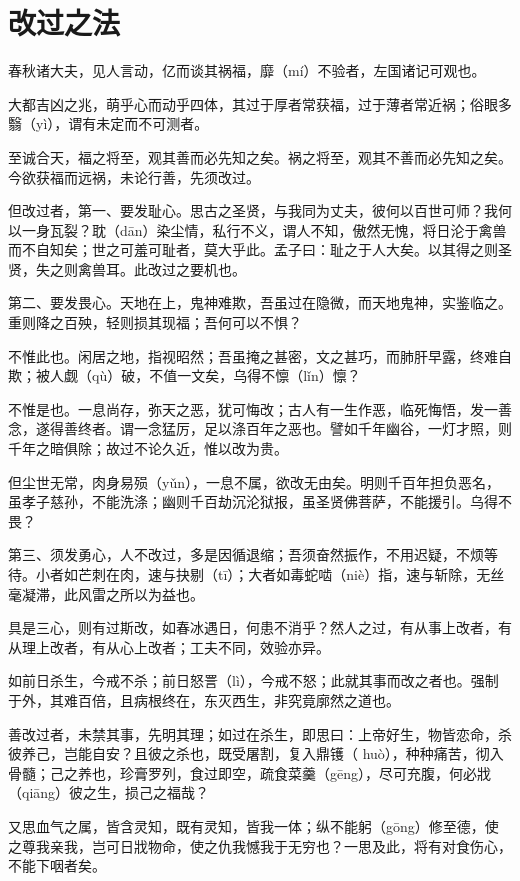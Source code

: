 \documentclass[12pt,UTF8]{ctexbook}
\begin{document}
\chapter{改过之法}

春秋诸大夫，见人言动，亿而谈其祸福，靡（mí）不验者，左国诸记可观也。

大都吉凶之兆，萌乎心而动乎四体，其过于厚者常获福，过于薄者常近祸；俗眼多翳（yì），谓有未定而不可测者。

至诚合天，福之将至，观其善而必先知之矣。祸之将至，观其不善而必先知之矣。今欲获福而远祸，未论行善，先须改过。

但改过者，第一、要发耻心。思古之圣贤，与我同为丈夫，彼何以百世可师？我何以一身瓦裂？耽（dān）染尘情，私行不义，谓人不知，傲然无愧，将日沦于禽兽而不自知矣；世之可羞可耻者，莫大乎此。孟子曰：耻之于人大矣。以其得之则圣贤，失之则禽兽耳。此改过之要机也。

第二、要发畏心。天地在上，鬼神难欺，吾虽过在隐微，而天地鬼神，实鉴临之。重则降之百殃，轻则损其现福；吾何可以不惧？

不惟此也。闲居之地，指视昭然；吾虽掩之甚密，文之甚巧，而肺肝早露，终难自欺；被人觑（qù）破，不值一文矣，乌得不懔（lǐn）懔？

不惟是也。一息尚存，弥天之恶，犹可悔改；古人有一生作恶，临死悔悟，发一善念，遂得善终者。谓一念猛厉，足以涤百年之恶也。譬如千年幽谷，一灯才照，则千年之暗俱除；故过不论久近，惟以改为贵。

但尘世无常，肉身易殒（yǔn），一息不属，欲改无由矣。明则千百年担负恶名，虽孝子慈孙，不能洗涤；幽则千百劫沉沦狱报，虽圣贤佛菩萨，不能援引。乌得不畏？

第三、须发勇心，人不改过，多是因循退缩；吾须奋然振作，不用迟疑，不烦等待。小者如芒刺在肉，速与抉剔（tī）；大者如毒蛇啮（niè）指，速与斩除，无丝毫凝滞，此风雷之所以为益也。

具是三心，则有过斯改，如春冰遇日，何患不消乎？然人之过，有从事上改者，有从理上改者，有从心上改者；工夫不同，效验亦异。

如前日杀生，今戒不杀；前日怒詈（lì），今戒不怒；此就其事而改之者也。强制于外，其难百倍，且病根终在，东灭西生，非究竟廓然之道也。

善改过者，未禁其事，先明其理；如过在杀生，即思曰：上帝好生，物皆恋命，杀彼养己，岂能自安？且彼之杀也，既受屠割，复入鼎镬（ huò），种种痛苦，彻入骨髓；己之养也，珍膏罗列，食过即空，疏食菜羹（gēng），尽可充腹，何必戕（qiāng）彼之生，损己之福哉？

又思血气之属，皆含灵知，既有灵知，皆我一体；纵不能躬（gōng）修至德，使之尊我亲我，岂可日戕物命，使之仇我憾我于无穷也？一思及此，将有对食伤心，不能下咽者矣。
\end{document}
